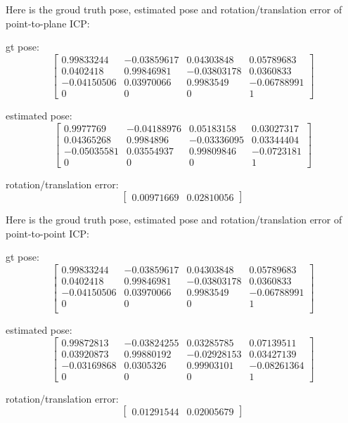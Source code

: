 \documentclass[11pt]{article}
\begin{document}
Here is the groud truth pose, estimated pose and rotation/translation error of point-to-plane ICP:

gt pose:
$$\begin{bmatrix}
    0.99833244 & -0.03859617 & 0.04303848 & 0.05789683\\
    0.0402418 & 0.99846981 & -0.03803178 & 0.0360833\\
    -0.04150506 & 0.03970066 & 0.9983549 & -0.06788991\\
    0 & 0 & 0 & 1    
\end{bmatrix}$$

estimated pose:
$$\begin{bmatrix}
    0.9977769 & -0.04188976 & 0.05183158 & 0.03027317\\
    0.04365268 & 0.9984896 & -0.03336095 & 0.03344404\\
    -0.05035581 & 0.03554937 & 0.99809846 & -0.0723181\\
    0 & 0 & 0 & 1
\end{bmatrix}$$

rotation/translation error:
$$\begin{bmatrix} 0.00971669 & 0.02810056 \end{bmatrix}$$

Here is the groud truth pose, estimated pose and rotation/translation error of point-to-point ICP:

gt pose:  
$$\begin{bmatrix} 
    0.99833244 & -0.03859617 & 0.04303848 & 0.05789683 \\
    0.0402418 & 0.99846981 & -0.03803178 & 0.0360833 \\
    -0.04150506 & 0.03970066 & 0.9983549 & -0.06788991 \\
     0 & 0 & 0 & 1 \\
\end{bmatrix}$$

estimated pose:  
$$\begin{bmatrix} 
    0.99872813 & -0.03824255 & 0.03285785 & 0.07139511 \\
    0.03920873 & 0.99880192 & -0.02928153 & 0.03427139 \\
    -0.03169868 & 0.0305326 & 0.99903101 & -0.08261364 \\
    0 & 0 & 0 & 1
\end{bmatrix}$$

rotation/translation error:
$$\begin{bmatrix} 0.01291544 & 0.02005679 \end{bmatrix}$$
\end{document}
